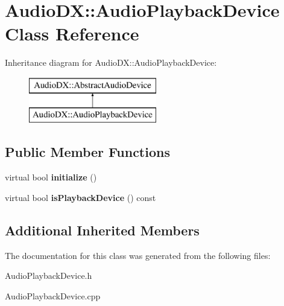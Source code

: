 \hypertarget{class_audio_d_x_1_1_audio_playback_device}{\section{Audio\-D\-X\-:\-:Audio\-Playback\-Device Class Reference}
\label{class_audio_d_x_1_1_audio_playback_device}
}
Inheritance diagram for Audio\-D\-X\-:\-:Audio\-Playback\-Device\-:\begin{figure}[H]
\begin{center}
\leavevmode
\includegraphics[height=2.000000cm]{class_audio_d_x_1_1_audio_playback_device}
\end{center}
\end{figure}
\subsection*{Public Member Functions}
\begin{DoxyCompactItemize}
\item 
\hypertarget{class_audio_d_x_1_1_audio_playback_device_abffabc4a3dbe82dfe059a8d5d8fd916c}{virtual bool {\bfseries initialize} ()}\label{class_audio_d_x_1_1_audio_playback_device_abffabc4a3dbe82dfe059a8d5d8fd916c}

\item 
\hypertarget{class_audio_d_x_1_1_audio_playback_device_ab3a966c43557f8cee9bac54d46ef08a0}{virtual bool {\bfseries is\-Playback\-Device} () const }\label{class_audio_d_x_1_1_audio_playback_device_ab3a966c43557f8cee9bac54d46ef08a0}

\end{DoxyCompactItemize}
\subsection*{Additional Inherited Members}


The documentation for this class was generated from the following files\-:\begin{DoxyCompactItemize}
\item 
Audio\-Playback\-Device.\-h\item 
Audio\-Playback\-Device.\-cpp\end{DoxyCompactItemize}
